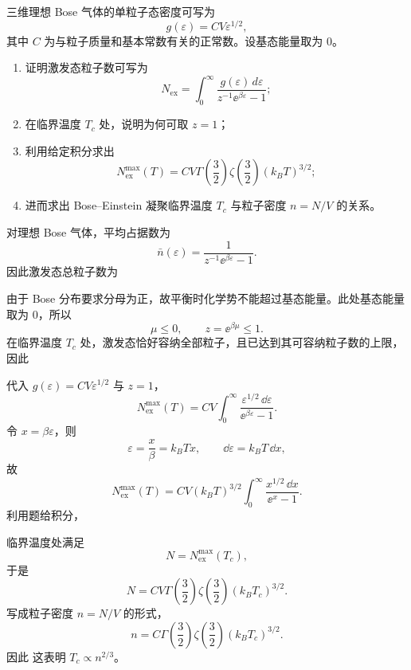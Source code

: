 \begin{question}
三维理想 Bose 气体的单粒子态密度可写为
\[
g(\varepsilon)=C V \varepsilon^{1/2},
\]
其中 $C$ 为与粒子质量和基本常数有关的正常数。设基态能量取为 $0$。

\begin{enumerate}[label=(\arabic*),leftmargin=2.5em]
  \item 证明激发态粒子数可写为
  \[
  N_{\mathrm{ex}}
  =
  \int_0^\infty \frac{g(\varepsilon)\,d\varepsilon}{z^{-1}\ee^{\beta\varepsilon}-1};
  \]
  \item 在临界温度 $T_c$ 处，说明为何可取 $z=1$；
  \item 利用给定积分求出
  \[
  N_{\mathrm{ex}}^{\max}(T)
  =
  C V \Gamma\!\left(\frac32\right)\zeta\!\left(\frac32\right)(k_B T)^{3/2};
  \]
  \item 进而求出 Bose--Einstein 凝聚临界温度 $T_c$ 与粒子密度 $n=N/V$ 的关系。
\end{enumerate}

\begin{solution}
对理想 Bose 气体，平均占据数为
\[
\bar n(\varepsilon)=\frac{1}{z^{-1}\ee^{\beta\varepsilon}-1}.
\]
因此激发态总粒子数为

由于 Bose 分布要求分母为正，故平衡时化学势不能超过基态能量。此处基态能量取为 $0$，所以
\[
\mu\le 0,\qquad z=\ee^{\beta\mu}\le 1.
\]
在临界温度 $T_c$ 处，激发态恰好容纳全部粒子，且已达到其可容纳粒子数的上限，因此

代入 $g(\varepsilon)=CV\varepsilon^{1/2}$ 与 $z=1$，
\[
N_{\mathrm{ex}}^{\max}(T)
=
CV\int_0^\infty \frac{\varepsilon^{1/2}\,\dd{\varepsilon}}{\ee^{\beta\varepsilon}-1}.
\]
令 $x=\beta\varepsilon$，则
\[
\varepsilon=\frac{x}{\beta}=k_BTx,\qquad \dd{\varepsilon}=k_B T\,\dd{x},
\]
故
\[
N_{\mathrm{ex}}^{\max}(T)
=
CV(k_B T)^{3/2}\int_0^\infty \frac{x^{1/2}\,\dd{x}}{\ee^x-1}.
\]
利用题给积分，

临界温度处满足
\[
N=N_{\mathrm{ex}}^{\max}(T_c),
\]
于是
\[
N=CV\Gamma\!\left(\frac32\right)\zeta\!\left(\frac32\right)(k_B T_c)^{3/2}.
\]
写成粒子密度 $n=N/V$ 的形式，
\[
n=C\Gamma\!\left(\frac32\right)\zeta\!\left(\frac32\right)(k_B T_c)^{3/2}.
\]
因此
这表明 $T_c\propto n^{2/3}$。
\end{solution}
\end{question}
